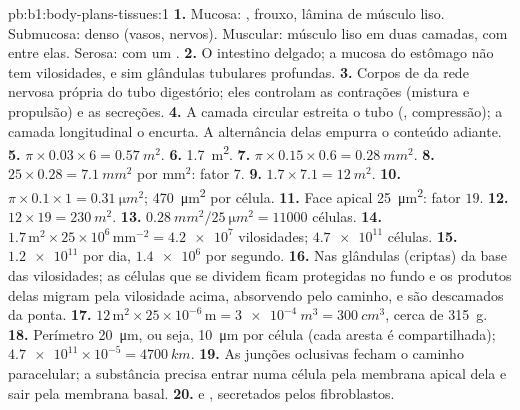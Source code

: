 \begin{solution}{pb:b1:body-plans-tissues:1}
\textbf{1.} Mucosa: ,  frouxo, lâmina de
músculo liso. Submucosa:  denso (vasos, nervos).
Muscular: músculo liso em duas camadas, com  entre elas.
Serosa:  com um .
\textbf{2.} O intestino delgado; a mucosa do estômago não tem
vilosidades, e sim glândulas tubulares profundas.
\textbf{3.} Corpos de  da rede nervosa própria do tubo
digestório; eles controlam as contrações (mistura e propulsão) e as
secreções.
\textbf{4.} A camada circular estreita o tubo (, compressão);
a camada longitudinal o encurta. A alternância delas empurra o conteúdo
adiante.
\textbf{5.} $\pi\times 0.03\times 6 = \qty{0.57}{m^2}$.
\textbf{6.} \qty{1.7}{m^2}.
\textbf{7.} $\pi\times 0.15\times 0.6 = \qty{0.28}{mm^2}$.
\textbf{8.} $25\times 0.28 = \qty{7.1}{mm^2}$ por mm$^2$: fator $7$.
\textbf{9.} $1.7\times 7.1 = \qty{12}{m^2}$.
\textbf{10.} $\pi\times 0.1\times 1 = \qty{0.31}{\micro m^2}$;
\qty{470}{\micro m^2} por célula.
\textbf{11.} Face apical \qty{25}{\micro m^2}: fator $19$.
\textbf{12.} $12\times 19 = \qty{230}{m^2}$.
\textbf{13.} $\qty{0.28}{mm^2}/\qty{25}{\micro m^2} = \num{11000}$ células.
\textbf{14.} $1.7\,\mathrm{m^2}\times 25\times 10^6\,\mathrm{mm^{-2}} =
\num{4.2e7}$ vilosidades; $\num{4.7e11}$ células.
\textbf{15.} $\num{1.2e11}$ por dia, $\num{1.4e6}$ por segundo.
\textbf{16.} Nas glândulas (criptas) da base das vilosidades; as células
que se dividem ficam protegidas no fundo e os produtos delas migram pela
vilosidade acima, absorvendo pelo caminho, e são descamados da ponta.
\textbf{17.} $12\,\mathrm{m^2}\times 25\times 10^{-6}\,\mathrm{m} =
\qty{3e-4}{m^3} = \qty{300}{cm^3}$, cerca de \qty{315}{g}.
\textbf{18.} Perímetro \qty{20}{\micro m}, ou seja, \qty{10}{\micro m}
por célula (cada aresta é compartilhada);
$\num{4.7e11}\times 10^{-5} = \qty{4700}{km}$.
\textbf{19.} As junções oclusivas fecham o caminho paracelular; a
substância precisa entrar numa célula pela membrana apical dela e sair
pela membrana basal.
\textbf{20.}  e , secretados pelos fibroblastos.

\end{solution}
